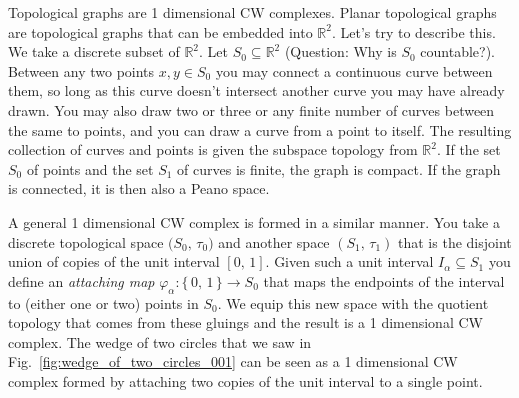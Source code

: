 \documentclass{article}
\theoremstyle{plain}
\theoremstyle{normal}
\newenvironment{example}{%
    \pushQED{\qed}\renewcommand{\qedsymbol}{$\blacksquare$}\examplex%
}{%
    \popQED\endexamplex%
}
\begin{document}
        \begin{example}
            Topological graphs are 1 dimensional CW complexes. Planar
            topological graphs are topological graphs that can be embedded into
            $\mathbb{R}^{2}$. Let's try to describe this. We take a discrete
            subset of $\mathbb{R}^{2}$. Let $S_{0}\subseteq\mathbb{R}^{2}$
            (Question: Why is $S_{0}$ countable?). Between any two points
            $x,y\in{S}_{0}$ you may connect a continuous curve between them,
            so long as this curve doesn't intersect another curve you may have
            already drawn. You may also draw two or three or any finite number
            of curves between the same to points, and you can draw a curve
            from a point to itself.
            The resulting collection of curves and points is given the subspace
            topology from $\mathbb{R}^{2}$. If the set $S_{0}$ of points and the
            set $S_{1}$ of curves is finite, the graph is compact. If the graph
            is connected, it is then also a Peano space.
            \par\hfill\par
            A general 1 dimensional CW complex is formed in a similar manner.
            You take a discrete topological space
            $\big(S_{0},\,\tau_{0}\big)$ and another space
            $(S_{1},\,\tau_{1})$ that is the disjoint union of copies of the
            unit interval $[0,\,1]$. Given such a unit interval
            $I_{\alpha}\subseteq{S}_{1}$ you define an \textit{attaching map}
            $\varphi_{\alpha}:\{\,0,\,1\,\}\rightarrow{S}_{0}$ that maps the
            endpoints of the interval to (either one or two) points in $S_{0}$.
            We equip this new space with the quotient topology that comes from
            these gluings and the result is a 1 dimensional CW complex.
            The wedge of two circles that we saw in
            Fig.~\ref{fig:wedge_of_two_circles_001} can be seen as a 1
            dimensional CW complex formed by attaching two copies of the
            unit interval to a single point.
        \end{example}
\end{document}
